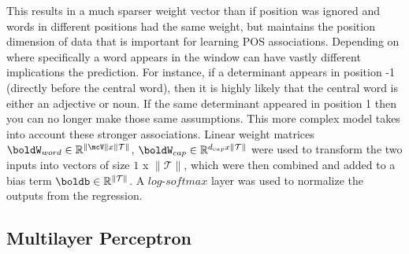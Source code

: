 \documentclass[11pt]{article}
\begin{document}
This results in a much sparser weight vector than if position was ignored and words in different positions had the same weight, but maintains the position dimension of data that is important for learning POS associations. Depending on where specifically a word appears in the window can have vastly different implications the prediction. For instance, if a determinant appears in position -1 (directly before the central word), then it is highly likely that the central word is either an adjective or noun. If the same determinant appeared in position 1 then you can no longer make those same assumptions. This more complex model takes into account these stronger associations. Linear weight matrices $\boldW_{word} \in \mathbb{R}^{\|\mcV\| x \|\mathcal{T}\|}$, $\boldW_{cap} \in \mathbb{R}^{d_{cap} x \|\mathcal{T}\|}$ were used to transform the two inputs into vectors of size $1$ x $\|\mathcal{T}\|$, which were then combined and added to a bias term $\boldb \in \mathbb{R}^{\|\mathcal{T}\|}$. A $log$-$softmax$ layer was used to normalize the outputs from the regression.

\subsection{Multilayer Perceptron}
\end{document}
